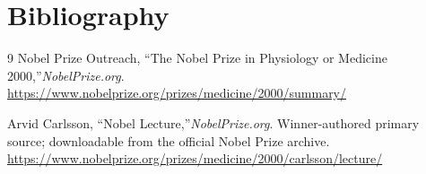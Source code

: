 \section{Bibliography}

\begin{thebibliography}{9}
Nobel Prize Outreach, ``The Nobel Prize in Physiology or Medicine 2000,''\emph{NobelPrize.org}.\\
\url{https://www.nobelprize.org/prizes/medicine/2000/summary/}

Arvid Carlsson, ``Nobel Lecture,''\emph{NobelPrize.org}. Winner-authored primary source; downloadable from the official Nobel Prize archive.\\
\url{https://www.nobelprize.org/prizes/medicine/2000/carlsson/lecture/}
\end{thebibliography}
